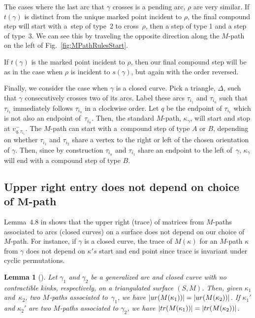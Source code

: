 \documentclass[11pt]{article}
\numberwithin{equation}{section}
\newtheorem{Lemma}[Theorem]{Lemma}
\begin{document}
The cases where the last arc that $\gamma$ crosses is a pending arc, $\rho$ are very similar. If $t(\gamma)$ is distinct from the unique marked point incident to $\rho$, the final compound step will start with a~step of type~2 to cross~$\rho$, then a step of type 1 and a step of type~3. We can see this by traveling the opposite direction along the $M$-path on the left of Fig.~\ref{fig:MPathRulesStart}.

If $t(\gamma)$ is the marked point incident to $\rho$, then our final compound step will be as in the case when $\rho$ is incident to $s(\gamma)$, but again with the order reversed.

Finally, we consider the case when $\gamma$ is a closed curve. Pick a triangle, $\Delta$, such that $\gamma$ consecutively crosses two of its arcs. Label these arcs $\tau_{i_1}$ and $\tau_{i_n}$ such that $\tau_{i_1}$ immediately follows $\tau_{i_n}$ in a clockwise order. Let $q$ be the endpoint of $\tau_{i_1}$ which is not also an endpoint of~$\tau_{i_n}$. Then, the standard $M$-path, $\kappa_\gamma$, will start and stop at $v_{q, \tau_{i_1}}^-$. The $M$-path can start with a~compound step of type $A$ or $B$, depending on whether $\tau_{i_1}$ and $\tau_{i_2}$ share a vertex to the right or left of the chosen orientation of $\gamma$. Then, since by construction $\tau_{i_n}$ and $\tau_{i_1}$ share an endpoint to the left of~$\gamma$, $\kappa_\gamma$ will end with a compound step of type $B$.

\subsection[Upper right entry does not depend on choice of $M$-path]{Upper right entry does not depend on choice of $\boldsymbol{M}$-path}

Lemma~4.8 in \cite{MW} shows that the upper right (trace) of matrices from $M$-paths associated to arcs (closed curves) on a surface does not depend on our choice of $M$-path. For instance, if $\gamma$ is a closed curve, the trace of $M(\kappa)$ for an $M$-path $\kappa$ from $\gamma$ does not depend on $\kappa's$ start and end point since trace is invariant under cyclic permutations.

\begin{Lemma}[{\cite[Lemma 4.8]{MW}}]\label{lem:MWMPathDontCare}
Let $\gamma_1$ and $\gamma_2$ be a generalized arc and closed curve with no contractible kinks, respectively, on a triangulated surface $(S,M)$. Then, given $\kappa_1$ and~$\kappa_2$, two $M$-paths associated to~$\gamma_1$, we have $\vert {\rm ur}(M(\kappa_1)) \vert = \vert {\rm ur}(M(\kappa_2))\vert $. If $\kappa_1'$ and $\kappa_2'$ are two $M$-paths associated to $\gamma_2$, we have $\vert {\rm tr}(M(\kappa_1)) \vert = \vert {\rm tr}(M(\kappa_2)) \vert$.
\end{Lemma}
\end{document}
